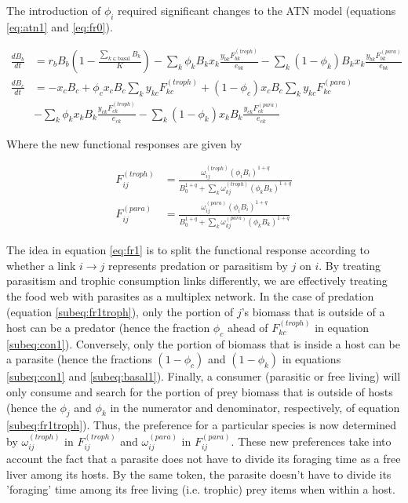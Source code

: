 \documentclass[/home/nkappler/Research/Dissertation/dissertation.tex]{subfiles}
\begin{document}
\begin{bibunit}
The introduction of $\phi_i$ required significant changes to the ATN model
(equations \eqref{eq:atn1} and \eqref{eq:fr0}).


\begin{subequations}\label{eq:atn1}
\begin{align}
    \frac{dB_{b}}{dt} &= r_bB_b\left(1-\frac{\sum_{k\in\text{basal}}B_k}{K}\right) - \sum_k\phi_kB_kx_k\frac{y_{bk}^{}F_{bk}^{(troph)}}{e_{bk}} - \sum_k(1-\phi_k)B_kx_k\frac{y_{bk}^{}F^{(para)}_{bk}}{e_{bk}}\label{subeq:basal1} \\ 
    \frac{dB_{c}}{dt} &= -x_cB_c + \phi_cx_cB_c\sum_ky_{kc}^{ }F^{(troph)}_{kc} + (1-\phi_c)x_cB_c\sum_ky_{kc}^{ }F^{(para)}_{kc} \label{subeq:con1}\\ 
    & - \sum_k \phi_kx_kB_k\frac{y_{ck}^{}F^{(troph)}_{ck}}{e_{ck}} - \sum_k (1-\phi_k)x_kB_k\frac{y_{ck}^{}F^{(para)}_{ck}}{e_{ck}}\nonumber
\end{align}
\end{subequations}

Where the new functional responses are given by 

\begin{subequations}\label{eq:fr1}
\begin{align}F_{ij}^{(troph)} &= \frac{\omega_{ij}^{(troph)}(\phi_iB_i)^{1+q}}{B_0^{1+q} + \sum_k\omega^{(troph)}_{kj}(\phi_kB_k)^{1+q}} \label{subeq:fr1troph}\\
F_{ij}^{(para)} &= \frac{\omega_{ij}^{(para)}(\phi_iB_i)^{1+q}}{B_0^{1+q} + \sum_k\omega^{(para)}_{kj}(\phi_kB_k)^{1+q}} \label{subeq:fr1para}
\end{align}
\end{subequations}

The idea in equation \ref{eq:fr1} is to split the functional response according
to whether a link $i\to j$ represents predation or parasitism by $j$ on $i$. By
treating parasitism and trophic consumption links differently, we are
effectively treating the food web with parasites as a multiplex network. In the
case of predation (equation \eqref{subeq:fr1troph}), only the portion of $j$'s
biomass that is outside of a host can be a predator (hence the fraction
$\phi_c$ ahead of $F_{kc}^{(troph)}$ in equation \eqref{subeq:con1}).
Conversely, only the portion of biomass that is inside a host can be a parasite
(hence the fractions $(1-\phi_c)$ and $(1-\phi_k)$ in equations
\eqref{subeq:con1} and \eqref{subeq:basal1}).  Finally, a consumer (parasitic
or free living) will only consume and search for the portion of prey biomass
that is outside of hosts (hence the $\phi_j$ and $\phi_k$ in the numerator and
denominator, respectively, of equation \eqref{subeq:fr1troph}).  Thus, the
preference for a particular species is now determined by
$\omega_{ij}^{(troph)}$ in $F_{ij}^{(troph)}$ and $\omega_{ij}^{(para)}$ in
$F_{ij}^{(para)}$. These new preferences take into account the fact that a
parasite does not have to divide its foraging time as a free liver among its
hosts. By the same token, the parasite doesn't have to divide its 'foraging'
time among its free living (i.e. trophic) prey items when within a host.


\end{bibunit}
\end{document}
